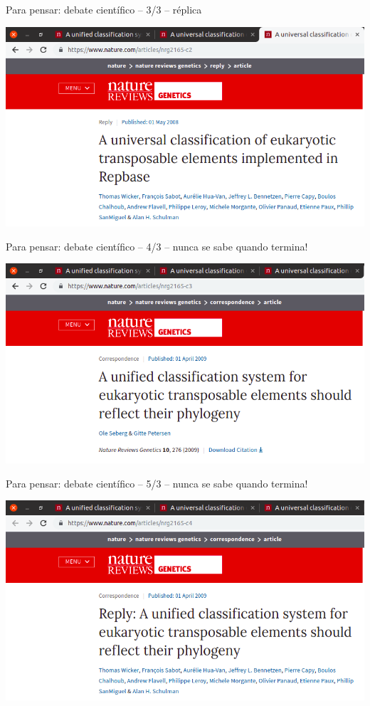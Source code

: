 \documentclass{beamer}
\begin{document}
\begin{frame}{\tiny Para pensar: debate científico -- 3/3 -- réplica}
  \begin{center}
    \includegraphics[width=\textwidth]{Encerramento/polemica3}
  \end{center}
\end{frame}

\begin{frame}{\tiny Para pensar: debate científico -- 4/3 -- nunca se sabe quando termina!}
  \begin{center}
    \includegraphics[width=\textwidth]{Encerramento/polemica4}
  \end{center}
\end{frame}

\begin{frame}{\tiny Para pensar: debate científico -- 5/3 -- nunca se sabe quando termina!}
  \begin{center}
    \includegraphics[width=\textwidth]{Encerramento/polemica5}
  \end{center}
\end{frame}
\end{document}
